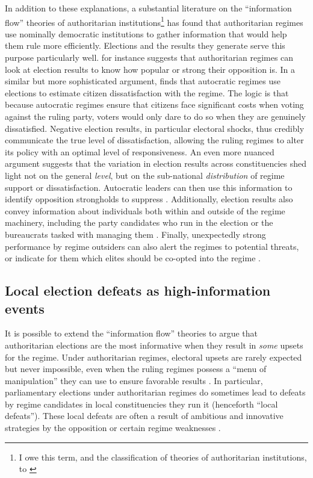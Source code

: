 \documentclass[12pt]{article}\usepackage[]{graphicx}\usepackage[]{color}
\newcommand{\1}{\mathbbm{1}}
\begin{document}
In addition to these explanations, a substantial literature on the ``information flow'' theories of authoritarian institutions\footnote{I owe this term, and the classification of theories of authoritarian institutions, to \cite{Hou2017}} has found that authoritarian regimes use nominally democratic institutions to gather information that would help them rule more efficiently. Elections and the results they generate serve this purpose particularly well. \cite{Geddes2005} for instance suggests that authoritarian regimes can look at election results to know how popular or strong their opposition is. In a similar but more sophisticated argument, \cite{Miller2015} finds that autocratic regimes use elections to estimate citizen dissatisfaction with the regime. The logic is that because autocratic regimes ensure that citizens face significant costs when voting against the ruling party, voters would only dare to do so when they are genuinely dissatisfied. Negative election results, in particular electoral shocks, thus credibly communicate the true level of dissatisfaction, allowing the ruling regimes to alter its policy with an optimal level of responsiveness. An even more nuanced argument suggests that the variation in election results across constituencies shed light not on the general \textit{level}, but on the sub-national \textit{distribution} of regime support or dissatisfaction. Autocratic leaders can then use this information to identify opposition strongholds to suppress \citep{Magaloni2006, Blaydes2008}. Additionally, election results also convey information about individuals both within and outside of the regime machinery, including the party candidates who run in the election \cite{someone} or the bureaucrats tasked with managing them \citep{Magaloni2006, Blaydes2008}. Finally, unexpectedly strong performance by regime outsiders can also alert the regimes to potential threats, or indicate for them which elites should be co-opted into the regime \cite{LustOkar2005}.

\subsection{Local election defeats as high-information events}
It is possible to extend the ``information flow'' theories to argue that authoritarian elections are the most informative when they result in \textit{some} upsets for the regime. Under authoritarian regimes, electoral upsets are rarely expected but never impossible, even when the ruling regimes possess a ``menu of manipulation'' they can use to ensure favorable results \citep{Schedler2002Menu}. In particular, parliamentary elections under authoritarian regimes do sometimes lead to defeats by regime candidates in local constituencies they run it (henceforth ``local defeats''). These local defeats are often a result of ambitious and innovative strategies by the opposition \citep{BunceWolchik2010} or certain regime weaknesses \citep{LevistkyWay2010}. 
\end{document}
